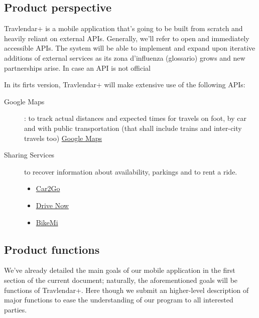 \subsection{Product perspective}

Travlendar+ is a mobile application that’s going to be built from scratch and heavily reliant on external APIs. 
Generally, we’ll refer to open and immediately accessible APIs. The system will be able to implement and expand upon iterative additions of external services as its zona d’influenza (glossario) grows and new partnerships arise.
In case an API is not official

In its firts version, Travlendar+ will make extensive use of the following APIs:
\begin{description}

	\item[Google Maps] : to track actual distances and expected times for travels on foot, by car and with public transportation (that shall include trains and inter-city travels too) 
	\href{https://developers.google.com/maps/}{Google Maps}
	\item[Sharing Services] to recover information about availability, parkings and to rent a ride.
	
	\begin{itemize}
		\item \href{https://github.com/car2go/openAPI}{Car2Go}
		\item \href{https://github.com/Autarc/drive-now}{Drive Now}
		\item \href{https://github.com/pierlauro/bikemi-unofficial-api}{BikeMi}
	\end{itemize}
	
\end{description}


			
\subsection{Product functions}
	
 We’ve already detailed the main goals of our mobile application in the first section of the current document; naturally, the aforementioned goals will be functions of Travlendar+.
Here though we submit an higher-level description of major functions to ease the understanding of our program to all interested parties.
		
